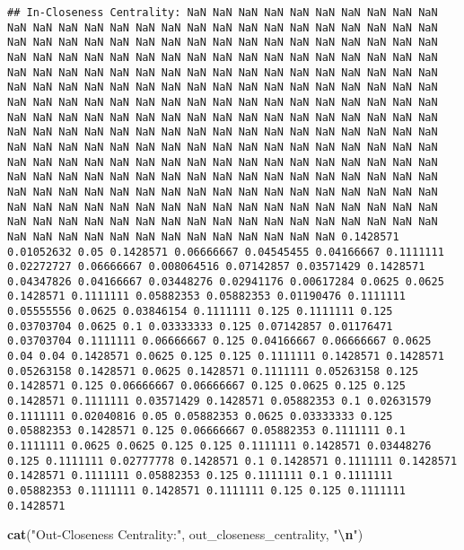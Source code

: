 \documentclass[
]{article}
\newenvironment{Shaded}{\begin{snugshade}}{\end{snugshade}}
\newcommand{\FunctionTok}[1]{\textcolor[rgb]{0.13,0.29,0.53}{\textbf{#1}}}
\newcommand{\NormalTok}[1]{#1}
\newcommand{\SpecialCharTok}[1]{\textcolor[rgb]{0.81,0.36,0.00}{\textbf{#1}}}
\newcommand{\StringTok}[1]{\textcolor[rgb]{0.31,0.60,0.02}{#1}}
\begin{document}
\begin{verbatim}
## In-Closeness Centrality: NaN NaN NaN NaN NaN NaN NaN NaN NaN NaN NaN NaN NaN NaN NaN NaN NaN NaN NaN NaN NaN NaN NaN NaN NaN NaN NaN NaN NaN NaN NaN NaN NaN NaN NaN NaN NaN NaN NaN NaN NaN NaN NaN NaN NaN NaN NaN NaN NaN NaN NaN NaN NaN NaN NaN NaN NaN NaN NaN NaN NaN NaN NaN NaN NaN NaN NaN NaN NaN NaN NaN NaN NaN NaN NaN NaN NaN NaN NaN NaN NaN NaN NaN NaN NaN NaN NaN NaN NaN NaN NaN NaN NaN NaN NaN NaN NaN NaN NaN NaN NaN NaN NaN NaN NaN NaN NaN NaN NaN NaN NaN NaN NaN NaN NaN NaN NaN NaN NaN NaN NaN NaN NaN NaN NaN NaN NaN NaN NaN NaN NaN NaN NaN NaN NaN NaN NaN NaN NaN NaN NaN NaN NaN NaN NaN NaN NaN NaN NaN NaN NaN NaN NaN NaN NaN NaN NaN NaN NaN NaN NaN NaN NaN NaN NaN NaN NaN NaN NaN NaN NaN NaN NaN NaN NaN NaN NaN NaN NaN NaN NaN NaN NaN NaN NaN NaN NaN NaN NaN NaN NaN NaN NaN NaN NaN NaN NaN NaN NaN NaN NaN NaN NaN NaN NaN NaN NaN NaN NaN NaN NaN NaN NaN NaN NaN NaN NaN NaN NaN NaN NaN NaN NaN NaN NaN NaN NaN NaN NaN NaN NaN NaN NaN NaN NaN NaN NaN NaN NaN NaN NaN NaN NaN NaN NaN NaN NaN NaN NaN NaN NaN NaN NaN NaN NaN NaN NaN NaN NaN NaN NaN 0.1428571 0.01052632 0.05 0.1428571 0.06666667 0.04545455 0.04166667 0.1111111 0.02272727 0.06666667 0.008064516 0.07142857 0.03571429 0.1428571 0.04347826 0.04166667 0.03448276 0.02941176 0.00617284 0.0625 0.0625 0.1428571 0.1111111 0.05882353 0.05882353 0.01190476 0.1111111 0.05555556 0.0625 0.03846154 0.1111111 0.125 0.1111111 0.125 0.03703704 0.0625 0.1 0.03333333 0.125 0.07142857 0.01176471 0.03703704 0.1111111 0.06666667 0.125 0.04166667 0.06666667 0.0625 0.04 0.04 0.1428571 0.0625 0.125 0.125 0.1111111 0.1428571 0.1428571 0.05263158 0.1428571 0.0625 0.1428571 0.1111111 0.05263158 0.125 0.1428571 0.125 0.06666667 0.06666667 0.125 0.0625 0.125 0.125 0.1428571 0.1111111 0.03571429 0.1428571 0.05882353 0.1 0.02631579 0.1111111 0.02040816 0.05 0.05882353 0.0625 0.03333333 0.125 0.05882353 0.1428571 0.125 0.06666667 0.05882353 0.1111111 0.1 0.1111111 0.0625 0.0625 0.125 0.125 0.1111111 0.1428571 0.03448276 0.125 0.1111111 0.02777778 0.1428571 0.1 0.1428571 0.1111111 0.1428571 0.1428571 0.1111111 0.05882353 0.125 0.1111111 0.1 0.1111111 0.05882353 0.1111111 0.1428571 0.1111111 0.125 0.125 0.1111111 0.1428571
\end{verbatim}

\begin{Shaded}
\begin{Highlighting}[]
\FunctionTok{cat}\NormalTok{(}\StringTok{"Out{-}Closeness Centrality:"}\NormalTok{, out\_closeness\_centrality, }\StringTok{"}\SpecialCharTok{\textbackslash{}n}\StringTok{"}\NormalTok{)}
\end{Highlighting}
\end{Shaded}
\end{document}
